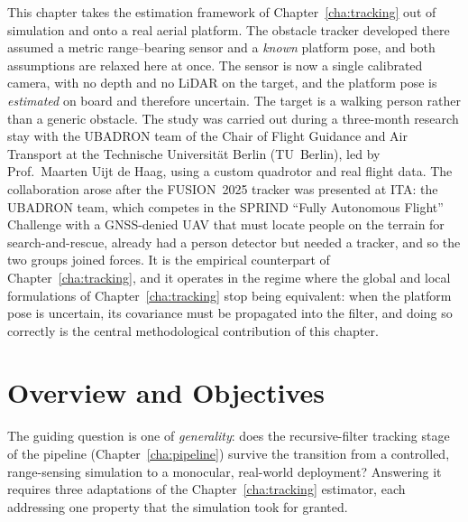 
This chapter takes the estimation framework of Chapter~\ref{cha:tracking} out of
simulation and onto a real aerial platform. The obstacle tracker developed there
assumed a metric range--bearing sensor and a \emph{known} platform pose, and both
assumptions are relaxed here at once. The sensor is now a single calibrated
camera, with no depth and no LiDAR on the target, and the platform pose is
\emph{estimated} on board and therefore uncertain. The target is a walking person
rather than a generic obstacle. The study was carried out during a three-month
research stay with the UBADRON team of the Chair of Flight Guidance and Air
Transport at the Technische Universit\"at Berlin (TU~Berlin), led by
Prof.~Maarten Uijt de Haag, using a custom quadrotor and real flight data. The
collaboration arose after the FUSION~2025 tracker was presented at ITA: the
UBADRON team, which competes in the SPRIND ``Fully Autonomous Flight'' Challenge
with a GNSS-denied UAV that must locate people on the terrain for
search-and-rescue, already had a person detector but needed a tracker, and so the
two groups joined forces. It is the
empirical counterpart of Chapter~\ref{cha:tracking}, and it operates in the
regime where the global and local formulations of Chapter~\ref{cha:tracking} stop
being equivalent: when the platform pose is uncertain, its covariance must be
propagated into the filter, and doing so correctly is the central methodological
contribution of this chapter.

\section{Overview and Objectives}
\label{sec:mono_overview}

The guiding question is one of \emph{generality}: does the recursive-filter
tracking stage of the pipeline (Chapter~\ref{cha:pipeline}) survive the
transition from a controlled, range-sensing simulation to a monocular,
real-world deployment? Answering it requires three adaptations of the
Chapter~\ref{cha:tracking} estimator, each addressing one property that the
simulation took for granted.


